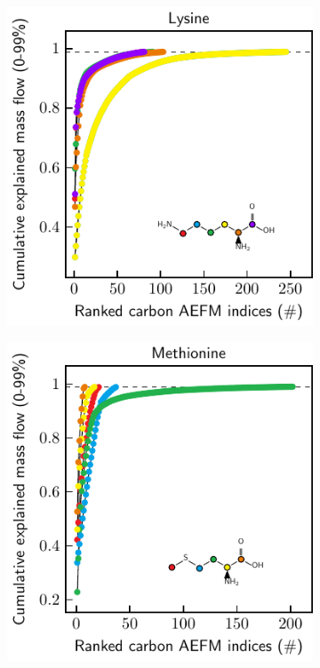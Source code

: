 \documentclass[]{article}
\begin{document}
\begin{figure}
    \begin{subfigure}[t]{0.247\textwidth}
        \caption{}
        \includegraphics[width=\textwidth]{subpanels/cumulative-source-met-22-legend.pdf}\\
    \end{subfigure}
    \begin{subfigure}[t]{0.247\textwidth}
        \caption{}
        \includegraphics[width=\textwidth]{subpanels/cumulative-source-met-23-legend.pdf}\\

\end{subfigure}
\end{figure}
\end{document}
